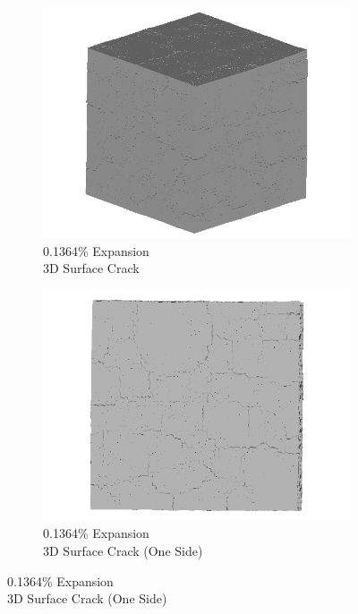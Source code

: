 \begin{figure}[ht!]
    \begin{subfigure}{.5\textwidth}
      \centering
      \includegraphics[width=0.5\linewidth]{Files/exp_3D/ASR/A15P75_2_3d.png}
      \caption{0.1364\% Expansion\\3D Surface Crack}
    \end{subfigure}%
    \begin{subfigure}{.5\textwidth}
      \centering
      \includegraphics[width=0.5\linewidth]{Files/exp_3D/ASR/A15P75_2_3ds.png}
      \caption{0.1364\% Expansion\\3D Surface Crack (One Side)}
    \end{subfigure}%


\end{figure}
